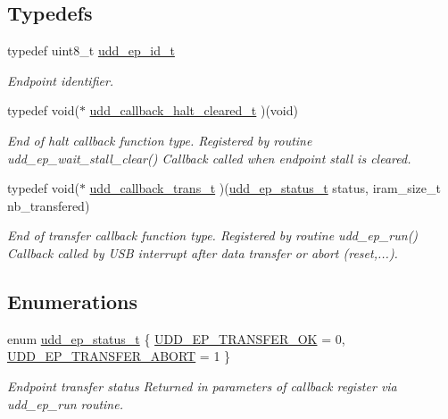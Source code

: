 \subsection*{\-Typedefs}
\begin{DoxyCompactItemize}
\item 
typedef uint8\-\_\-t \hyperlink{group__udd__group_ga6f25ea016c07bd48c3074f51d8ef8b01}{udd\-\_\-ep\-\_\-id\-\_\-t}
\begin{DoxyCompactList}\small\item\em \-Endpoint identifier. \end{DoxyCompactList}\item 
typedef void($\ast$ \hyperlink{group__udd__group_ga7ab8d43f0761ecfb4d48770ac4ebb661}{udd\-\_\-callback\-\_\-halt\-\_\-cleared\-\_\-t} )(void)
\begin{DoxyCompactList}\small\item\em \-End of halt callback function type. \-Registered by routine udd\-\_\-ep\-\_\-wait\-\_\-stall\-\_\-clear() \-Callback called when endpoint stall is cleared. \end{DoxyCompactList}\item 
typedef void($\ast$ \hyperlink{group__udd__group_gad866ed9444482edcf92a28dce807e3d3}{udd\-\_\-callback\-\_\-trans\-\_\-t} )(\hyperlink{group__udd__group_gac0f77f5a0e085af1242b48fd1054959a}{udd\-\_\-ep\-\_\-status\-\_\-t} status, iram\-\_\-size\-\_\-t nb\-\_\-transfered)
\begin{DoxyCompactList}\small\item\em \-End of transfer callback function type. \-Registered by routine udd\-\_\-ep\-\_\-run() \-Callback called by \-U\-S\-B interrupt after data transfer or abort (reset,...). \end{DoxyCompactList}\end{DoxyCompactItemize}
\subsection*{\-Enumerations}
\begin{DoxyCompactItemize}
\item 
enum \hyperlink{group__udd__group_gac0f77f5a0e085af1242b48fd1054959a}{udd\-\_\-ep\-\_\-status\-\_\-t} \{ \hyperlink{group__udd__group_ggac0f77f5a0e085af1242b48fd1054959aad52bb23180c67dc3d6a1d1dfedf74102}{\-U\-D\-D\-\_\-\-E\-P\-\_\-\-T\-R\-A\-N\-S\-F\-E\-R\-\_\-\-O\-K} =  0, 
\hyperlink{group__udd__group_ggac0f77f5a0e085af1242b48fd1054959aa010443246cb439e4f6f52b13c9d6e29c}{\-U\-D\-D\-\_\-\-E\-P\-\_\-\-T\-R\-A\-N\-S\-F\-E\-R\-\_\-\-A\-B\-O\-R\-T} =  1
 \}
\begin{DoxyCompactList}\small\item\em \-Endpoint transfer status \-Returned in parameters of callback register via udd\-\_\-ep\-\_\-run routine. \end{DoxyCompactList}\end{DoxyCompactItemize}

